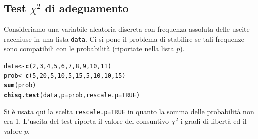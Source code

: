 \documentclass[onecolumn,12pt]{book}\usepackage[]{graphicx}\usepackage[]{color}
\makeatletter
\newcommand{\hlnum}[1]{\textcolor[rgb]{0.686,0.059,0.569}{#1}}%
\newcommand{\hlstd}[1]{\textcolor[rgb]{0.345,0.345,0.345}{#1}}%
\newcommand{\hlkwb}[1]{\textcolor[rgb]{0.69,0.353,0.396}{#1}}%
\newcommand{\hlkwc}[1]{\textcolor[rgb]{0.333,0.667,0.333}{#1}}%
\newcommand{\hlkwd}[1]{\textcolor[rgb]{0.737,0.353,0.396}{\textbf{#1}}}%
\newenvironment{kframe}{%
 \def\at@end@of@kframe{}%
 \ifinner\ifhmode%
  \def\at@end@of@kframe{\end{minipage}}%
  \begin{minipage}{\columnwidth}%
 \fi\fi%
 \def\FrameCommand##1{\hskip\@totalleftmargin \hskip-\fboxsep
 \colorbox{shadecolor}{##1}\hskip-\fboxsep
     \hskip-\linewidth \hskip-\@totalleftmargin \hskip\columnwidth}%
 \MakeFramed {\advance\hsize-\width
   \@totalleftmargin\z@ \linewidth\hsize
   \@setminipage}}%
 {\par\unskip\endMakeFramed%
 \at@end@of@kframe}
\newenvironment{knitrout}{}{} %
\makeatother
\begin{document}
\subsection{Test $\chi^2$  di adeguamento}
Consideriamo una variabile aleatoria discreta con frequenza assoluta delle uscite racchiuse in una lista \texttt{data}. Ci si pone il problema di stabilire se tali frequenze sono compatibili con le probabilit\`a (riportate nella lista $p$).
\begin{knitrout}
\color{fgcolor}\begin{kframe}
\begin{alltt}
\hlstd{data}\hlkwb{<-}\hlkwd{c}\hlstd{(}\hlnum{2}\hlstd{,}\hlnum{3}\hlstd{,}\hlnum{4}\hlstd{,}\hlnum{5}\hlstd{,}\hlnum{6}\hlstd{,}\hlnum{7}\hlstd{,}\hlnum{8}\hlstd{,}\hlnum{9}\hlstd{,}\hlnum{10}\hlstd{,}\hlnum{11}\hlstd{)}
\hlstd{prob}\hlkwb{<-}\hlkwd{c}\hlstd{(}\hlnum{5}\hlstd{,}\hlnum{20}\hlstd{,}\hlnum{5}\hlstd{,}\hlnum{10}\hlstd{,}\hlnum{5}\hlstd{,}\hlnum{15}\hlstd{,}\hlnum{5}\hlstd{,}\hlnum{10}\hlstd{,}\hlnum{10}\hlstd{,}\hlnum{15}\hlstd{)}
\hlkwd{sum}\hlstd{(prob)}
\hlkwd{chisq.test}\hlstd{(data,}\hlkwc{p}\hlstd{=prob,}\hlkwc{rescale.p}\hlstd{=}\hlnum{TRUE}\hlstd{)}
\end{alltt}
\end{kframe}
\end{knitrout}
Si \`e usata qui la scelta \texttt{rescale.p=TRUE} in quanto la somma delle  probabilit\`a non era 1.
L'uscita del test riporta il valore del consuntivo $\chi^2$ i gradi di libert\`a ed il valore $p$.
\end{document}

